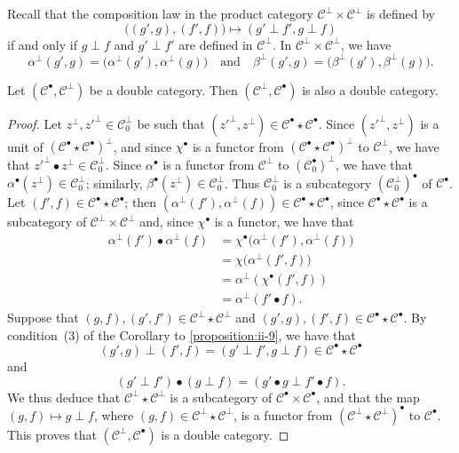 \documentclass[a4paper,fleqn]{article}
\theoremstyle{plain}
\newenvironment{theorem}[1]
  {\renewcommand\theinnertheorem{#1}\innertheorem}
  {\endinnertheorem}
\theoremstyle{definition}
\newcommand{\oldpage}[1]{{\marginpar{\footnotesize$\bigg\vert$\,\,\,\,\textit{p.~#1}}}}
\newcommand{\textand}{\quad\text{and}\quad}
\newcommand{\CC}{\mathcal{C}}
\begin{document}
Recall that the composition law in the product category $\CC^\perp\times\CC^\perp$ is defined by
\[
  \big(
    (g',g), (f',f)
  \big)
  \longmapsto (g'\perp f',g\perp f)
\]
if and only if $g\perp f$ and $g'\perp f'$ are defined in $\CC^\perp$.
In $\CC^\perp\times\CC^\perp$, we have
\[
  \alpha^\perp(g',g)
  =\big(
    \alpha^\perp(g'), \alpha^\perp(g)
  \big)
  \textand
  \beta^\perp(g',g)
  =\big(
    \beta^\perp(g'), \beta^\perp(g)
  \big).
\]

\oldpage{390}

\begin{theorem}{4}
\label{theorem:ii-4}
  Let $(\CC^\bullet,\CC^\perp)$ be a double category.
  Then $(\CC^\perp,\CC^\bullet)$ is also a double category.
\end{theorem}

\begin{proof}
  Let $z^\perp,z'^\perp\in\CC_0^\perp$ be such that $(z'^\perp,z^\perp)\in\CC^\bullet\star\CC^\bullet$.
  Since $(z'^\perp,z^\perp)$ is a unit of $(\CC^\bullet\star\CC^\bullet)^\perp$, and since $\chi^\bullet$ is a functor from $(\CC^\bullet\star\CC^\bullet)^\perp$ to $\CC^\perp$, we have that $z'^{\perp}\bullet z^\perp\in\CC_0^\perp$.
  Since $\alpha^\bullet$ is a functor from $\CC^\perp$ to $(\CC_0^\bullet)^\perp$, we have that $\alpha^\bullet(z^\perp)\in\CC_0^\perp$;
  similarly, $\beta^\bullet(z^\perp)\in\CC_0^\perp$.
  Thus $\CC_0^\perp$ is a subcategory $(\CC_0^\perp)^\bullet$ of $\CC^\bullet$.
  Let $(f',f)\in\CC^\bullet\star\CC^\bullet$;
  then $(\alpha^\perp(f'),\alpha^\perp(f))\in\CC^\bullet\star\CC^\bullet$, since $\CC^\bullet\star\CC^\bullet$ is a subcategory of $\CC^\perp\times\CC^\perp$ and, since $\chi^\bullet$ is a functor, we have that
  \[
    \begin{aligned}
      \alpha^\perp(f')\bullet\alpha^\perp(f)
      &= \chi^\bullet\big(
        \alpha^\perp(f'), \alpha^\perp(f)
      \big)
    \\&= \chi\big(
        \alpha^\perp(f',f)
      \big)
    \\&= \alpha^\perp(\chi^\bullet(f',f))
    \\&= \alpha^\perp(f'\bullet f).
    \end{aligned}
  \]
  Suppose that $(g,f),(g',f')\in\CC^\perp\star\CC^\perp$ and $(g',g),(f',f)\in\CC^\bullet\star\CC^\bullet$.
  By condition~(3) of the Corollary to \cref{proposition:ii-9}, we have that
  \[
    (g',g)\perp(f',f)
    = (g'\perp f',g\perp f)
    \in\CC^\bullet\star\CC^\bullet
  \]
  and
  \[
    (g'\perp f')\bullet(g\perp f)
    = (g'\bullet g\perp f'\bullet f).
  \]
  We thus deduce that $\CC^\perp\star\CC^\perp$ is a subcategory of $\CC^\bullet\times\CC^\bullet$, and that the map $(g,f)\mapsto g\perp f$, where $(g,f)\in\CC^\perp\star\CC^\perp$, is a functor from $(\CC^\perp\star\CC^\perp)^\bullet$ to $\CC^\bullet$.
  This proves that $(\CC^\perp,\CC^\bullet)$ is a double category.
\end{proof}
\end{document}
